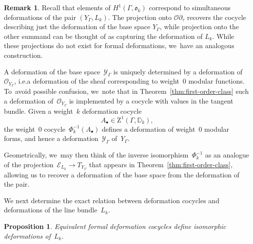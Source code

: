 \documentclass[JEP,XML,SOM,Unicode,published]{cedram}
\let\oldbullet\bullet
\renewcommand{\bullet}{{\scriptscriptstyle\oldbullet}}
\theoremstyle{plain}
\newtheorem{proposition}[theoremcounter]{Proposition}
\theoremstyle{definition}
\newtheorem{remark}[theoremcounter]{Remark}
\newcommand{\tx}{\text}
\newcommand{\bbD}{\ensuremath{\mathbb{D}}}
\newcommand{\cE}{\ensuremath{\mathcal{E}}}
\newcommand{\cO}{\ensuremath{\mathcal{O}}}
\newcommand{\cY}{\ensuremath{\mathcal{Y}}}
\newcommand{\frako}{\ensuremath{\mathfrak{o}}}
\newcommand{\rmZ}{\ensuremath{\mathrm{Z}}}
\let\Ga\Gamma
\begin{document}
\begin{remark}\label{subsec:base-def}
Recall that elements of $H^1(\Ga,\frako_k)$ correspond to simultaneous deformations of the pair $(Y_\Ga,L_k)$. The projection onto $\cO \partial_\tau$ recovers the cocycle describing just the deformation of the base space $Y_\Ga$, while projection onto the other summand can be thought of as capturing the deformation of $L_k$. While these projections do not exist for formal deformations, we~have an analogous construction.

A deformation of the base space~$\cY_\Ga$ is uniquely determined by a deformation of~$\cO_{Y_\Ga}$, i.e.\@ a deformation of the sheaf corresponding to weight~$0$ modular functions. To~avoid possible confusion, we~note that in Theorem~\ref{thm:first-order-class} such a deformation of~$\cO_{Y_\Ga}$ is implemented by a cocycle with values in the tangent bundle. Given a weight~$k$ deformation cocycle\vspace*{-3pt}
\begin{equation*}
A_\bullet \in \rmZ^1(\Ga,\bbD_k)
\tx{,}
\end{equation*}
the weight~$0$ cocycle~$\Phi_k^{-1}(A_\bullet)$ defines a deformation of weight~$0$ modular forms, and hence a deformation~$\cY_\Ga$ of~$Y_\Ga$.

Geometrically, we~may then think of the inverse isomorphism~$\Phi_k^{-1}$ as an analogue of the projection~$\cE_{L_k} \to T_{Y_\Ga}$ that appears in Theorem~\ref{thm:first-order-class}, allowing us to recover a deformation of the base space from the deformation of the pair.
\end{remark}

We next determine the exact relation between deformation cocycles and deformations of the line bundle~$L_k$.

\begin{proposition}
\label{prop:equivalent-cocycles}
Equivalent formal deformation cocycles define isomorphic deformations of~\/$L_k$.
\end{proposition}
\end{document}
